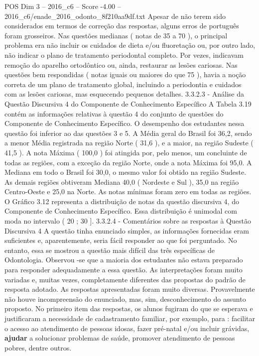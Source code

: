 \begin{textsample}{POS Dim 3 – 2016\_c6 – Score -4.00 – 2016\_c6/enade\_2016\_odonto\_8f210aa9df.txt}
Apesar de não terem sido considerados em termos de correção das respostas, alguns erros de português foram grosseiros.
Nas questões medianas ( notas de 35 a 70 ), o principal problema era não incluir os cuidados de dieta e/ou fluoretação ou, por outro lado, não indicar o plano de tratamento periodontal completo.
Por vezes, indicavam remoção do aparelho ortodôntico ou, ainda, restaurar as lesões cariosas.
Nas questões bem respondidas ( notas iguais ou maiores do que 75 ), havia a noção correta de um plano de tratamento global, incluindo a periodontia e cuidados com as lesões cariosas, mas esquecendo pequenos detalhes. 3.3.2.3 - Análise da Questão Discursiva 4 do Componente de Conhecimento Específico A Tabela 3.19 contém as informações relativas à questão 4 do conjunto de questões do Componente de Conhecimento Específico.
O desempenho dos estudantes nessa questão foi inferior ao das questões 3 e 5.
A Média geral do Brasil foi 36,2, sendo a menor Média registrada na região Norte ( 31,6 ), e a maior, na região Sudeste ( 41,5 ).
A nota Máxima ( 100,0 ) foi atingida por, pelo menos, um concluinte de todas as regiões, com a exceção da região Norte, onde a nota Máxima foi 95,0.
A Mediana em todo o Brasil foi 30,0, o mesmo valor foi obtido na região Sudeste.
As demais regiões obtiveram Mediana 40,0 ( Nordeste e Sul ), 35,0 na região Centro-Oeste e 25,0 na Norte.
As notas mínimas foram zero em todas as regiões.
O Gráfico 3.12 representa a distribuição de notas da questão discursiva 4, do Componente de Conhecimento Específico.
Essa distribuição é unimodal com moda no intervalo ( 20 ; 30 ]. 3.3.2.4 - Comentários sobre as respostas à Questão Discursiva 4 A questão tinha enunciado simples, as informações fornecidas eram suficientes e, aparentemente, seria fácil responder ao que foi perguntado.
No entanto, essa se mostrou a questão mais difícil das três específicas de Odontologia.
Observou -se que a maioria dos estudantes não estava preparado para responder adequadamente a essa questão.
As interpretações foram muito variadas e, muitas vezes, completamente diferentes das propostas do padrão de resposta adotado.
As respostas apresentadas foram muito diversas.
Provavelmente não houve incompreensão do enunciado, mas, sim, desconhecimento do assunto proposto.
No primeiro item das respostas, os alunos fugiram do que se esperava e justificaram a necessidade de cadastramento familiar, por exemplo, para : facilitar o acesso ao atendimento de pessoas idosas, fazer pré-natal e/ou incluir grávidas, \textbf{ajudar} a solucionar problemas de saúde, promover atendimento de pessoas pobres, dentre outros.

\end{textsample}
